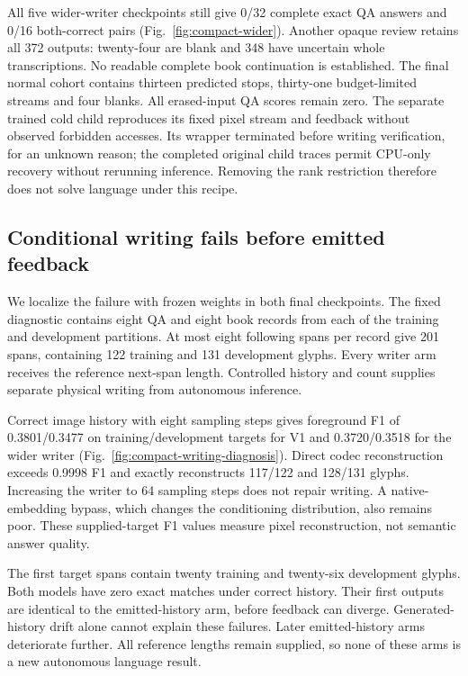\documentclass[12pt,a4paper]{article}
\begin{document}
All five wider-writer checkpoints still give 0/32 complete exact QA answers
and 0/16 both-correct pairs (Fig.~\ref{fig:compact-wider}). Another opaque
review retains all 372 outputs: twenty-four are blank and 348 have uncertain
whole transcriptions. No readable complete book continuation is established.
The final normal cohort contains thirteen predicted stops, thirty-one
budget-limited streams and four blanks. All erased-input QA scores remain
zero. The separate trained cold child reproduces its fixed pixel stream and
feedback without observed forbidden accesses. Its wrapper terminated before
writing verification, for an unknown reason; the completed original child
traces permit CPU-only recovery without rerunning inference. Removing the
rank restriction therefore does not solve language under this recipe.

\subsection*{Conditional writing fails before emitted feedback}
We localize the failure with frozen weights in both final checkpoints.
The fixed diagnostic contains eight QA and eight book records from each of
the training and development partitions. At most eight following spans per
record give 201 spans, containing 122 training and 131 development glyphs.
Every writer arm receives the reference next-span length. Controlled history
and count supplies separate physical writing from autonomous inference.

Correct image history with eight sampling steps gives foreground F1 of
0.3801/0.3477 on training/development targets for V1 and 0.3720/0.3518 for
the wider writer (Fig.~\ref{fig:compact-writing-diagnosis}). Direct codec
reconstruction exceeds 0.9998 F1 and exactly reconstructs 117/122 and
128/131 glyphs. Increasing the writer to 64 sampling steps does not repair
writing. A native-embedding bypass, which changes the conditioning
distribution, also remains poor. These supplied-target F1 values measure
pixel reconstruction, not semantic answer quality.

The first target spans contain twenty training and twenty-six development
glyphs. Both models have zero exact matches under correct history. Their
first outputs are identical to the emitted-history arm, before feedback can
diverge. Generated-history drift alone cannot explain these failures.
Later emitted-history arms deteriorate further. All reference lengths remain
supplied, so none of these arms is a new autonomous language result.
\end{document}
